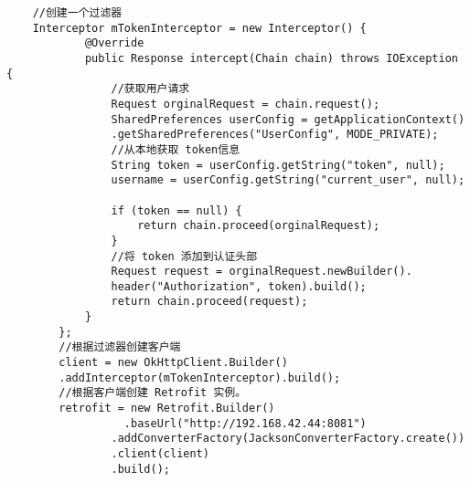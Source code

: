 \begin{verbatim}
    //创建一个过滤器
    Interceptor mTokenInterceptor = new Interceptor() {
            @Override
            public Response intercept(Chain chain) throws IOException {
                //获取用户请求
                Request orginalRequest = chain.request();
                SharedPreferences userConfig = getApplicationContext()
                .getSharedPreferences("UserConfig", MODE_PRIVATE);
                //从本地获取 token信息
                String token = userConfig.getString("token", null);
                username = userConfig.getString("current_user", null);

                if (token == null) {
                    return chain.proceed(orginalRequest);
                }
                //将 token 添加到认证头部
                Request request = orginalRequest.newBuilder().
                header("Authorization", token).build();
                return chain.proceed(request);
            }
        };
        //根据过滤器创建客户端
        client = new OkHttpClient.Builder()
        .addInterceptor(mTokenInterceptor).build();
        //根据客户端创建 Retrofit 实例。
        retrofit = new Retrofit.Builder()
                  .baseUrl("http://192.168.42.44:8081")
                .addConverterFactory(JacksonConverterFactory.create())
                .client(client)
                .build();
\end{verbatim}














